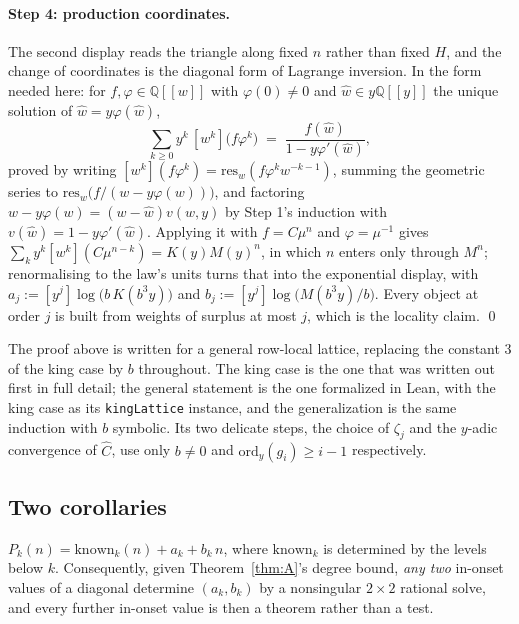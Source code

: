 \documentclass[11pt]{article}
\newcommand{\Q}{\mathbb{Q}}
\begin{document}
\paragraph{Step 4: production coordinates.} The second display reads the triangle
along fixed $n$ rather than fixed $H$, and the change of coordinates is the
diagonal form of Lagrange inversion. In the form needed here: for
$f, \varphi \in \Q[[w]]$ with $\varphi(0) \ne 0$ and $\hat w \in y\Q[[y]]$ the
unique solution of $\hat w = y\varphi(\hat w)$,
\[
  \sum_{k \ge 0} y^k\,[w^k]\bigl(f\varphi^k\bigr)
  \;=\; \frac{f(\hat w)}{1 - y\varphi'(\hat w)} ,
\]
proved by writing $[w^k](f\varphi^k) = \mathrm{res}_w(f\varphi^k w^{-k-1})$,
summing the geometric series to $\mathrm{res}_w\bigl(f/(w - y\varphi(w))\bigr)$,
and factoring $w - y\varphi(w) = (w-\hat w)v(w,y)$ by Step 1's induction with
$v(\hat w) = 1 - y\varphi'(\hat w)$. Applying it with $f = C\mu^n$ and
$\varphi = \mu^{-1}$ gives $\sum_k y^k [w^k](C\mu^{n-k}) = K(y)M(y)^n$, in which $n$
enters only through $M^n$; renormalising to the law's units turns that
into the exponential display, with
$a_j := [y^j]\log\bigl(b\,K(b^3 y)\bigr)$ and
$b_j := [y^j]\log\bigl(M(b^3 y)/b\bigr)$. Every object at order $j$ is built from
weights of surplus at most $j$, which is the locality claim. \qed

\begin{remark}[scope]
The proof above is written for a general row-local lattice, replacing the
constant $3$ of the king case by $b$ throughout. The king case is the one that
was written out first in full detail; the general statement is the one
formalized in Lean, with the king case as its \texttt{kingLattice} instance,
and the generalization is the same induction with $b$ symbolic. Its two delicate steps,
the choice of $\zeta_j$ and the $y$-adic convergence of $\hat C$, use only
$b \ne 0$ and $\mathrm{ord}_y(g_i) \ge i-1$ respectively.
\end{remark}

\subsection{Two corollaries}

\begin{corollary}
\label{cor:two}
$P_k(n) = \mathrm{known}_k(n) + a_k + b_k\,n$, where $\mathrm{known}_k$ is
determined by the levels below $k$. Consequently, given
Theorem~\ref{thm:A}'s degree bound, \emph{any two} in-onset values of a diagonal
determine $(a_k,b_k)$ by a nonsingular $2\times2$ rational solve, and every further
in-onset value is then a theorem rather than a test.
\end{corollary}
\end{document}
